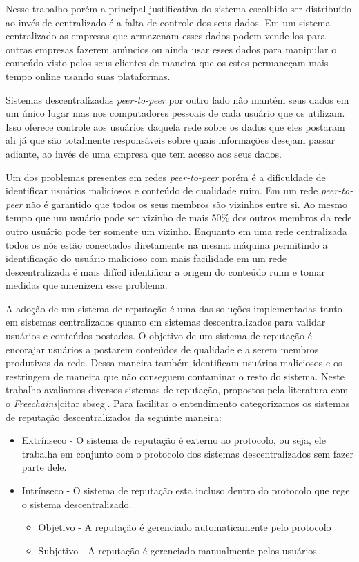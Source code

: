 \documentclass[12pt]{article}
\newcommand{\FC} {\emph{Freechains}\xspace}
\newcommand{\PtoP} {\emph{peer-to-peer}\xspace}
\begin{document}
Nesse trabalho porém a principal justificativa do sistema escolhido ser distribuído ao invés de centralizado é a falta de controle dos seus dados.
Em um sistema centralizado as empresas que armazenam esses dados podem vende-los para outras empresas fazerem anúncios ou ainda usar esses dados para manipular o conteúdo visto pelos seus clientes de maneira que os estes permaneçam mais tempo online usando suas plataformas. 

Sistemas descentralizadas \PtoP por outro lado não mantém seus dados em um único lugar mas nos computadores pessoais de cada usuário que os utilizam.
Isso oferece controle aos usuários daquela rede sobre os dados que eles postaram ali já que são totalmente responsáveis sobre quais informações desejam passar adiante, ao invés de uma empresa que tem acesso aos seus dados. 

Um dos problemas presentes em redes \PtoP porém é a dificuldade de identificar usuários maliciosos e conteúdo de qualidade ruim.
Em um rede \PtoP não é garantido que todos os seus membros são vizinhos entre si.
Ao mesmo tempo que um usuário pode ser vizinho de mais 50\% dos outros membros da rede outro usuário pode ter somente um vizinho.
Enquanto em uma rede centralizada todos os nós estão conectados diretamente na mesma máquina permitindo a identificação do usuário malicioso com mais facilidade em um rede descentralizada é mais difícil identificar a origem do conteúdo ruim e tomar medidas que amenizem esse problema.

A adoção de um sistema de reputação é uma das soluções implementadas tanto em sistemas centralizados quanto em sistemas descentralizados para validar usuários e conteúdos postados.
O objetivo de um sistema de reputação é encorajar usuários a postarem conteúdos de qualidade e a serem membros produtivos da rede.
Dessa maneira também identificam usuários maliciosos e os restringem de maneira que não conseguem contaminar o resto do sistema.
Neste trabalho avaliamos diversos sistemas de reputação, propostos pela literatura com o \FC [citar sbseg]. 
Para facilitar o entendimento categorizamos os sistemas de reputação descentralizados da seguinte maneira:

\begin{itemize}
    \item Extrínseco - O sistema de reputação é externo ao protocolo, ou seja, ele trabalha em conjunto com o protocolo dos sistemas descentralizados sem fazer parte dele.
    \item Intrínseco - O sistema de reputação esta incluso dentro do protocolo que rege o sistema descentralizado.
    \begin{itemize}
        \item Objetivo - A reputação é gerenciado automaticamente pelo protocolo
        \item Subjetivo - A reputação é gerenciado manualmente pelos usuários.
    \end{itemize}
\end{itemize}
\end{document}
